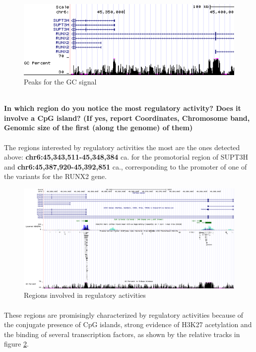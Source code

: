 \documentclass[12pt, a4paper]{article}
\begin{document}
\begin{figure}[h]
		\centering
		\includegraphics[width = .8\textwidth]{GC_peaks}
		\caption{Peaks for the GC signal}
		\label{GC peaks}
\end{figure}
	
\textbf{\\ In which region do you notice the most regulatory activity? Does it involve a CpG island? (If yes, report Coordinates, Chromosome band, Genomic size of the first (along the genome) of them)}%
\paragraph{}The regions interested by regulatory activities the most are the ones detected above: \textbf{chr6:45,343,511-45,348,384} ca. for the promotorial region of SUPT3H and \textbf{chr6:45,387,920-45,392,851} ca., corresponding to the promoter of one of the variants for the RUNX2 gene.

\begin{figure}[h]
	\centering
	\includegraphics[width = \textwidth]{regulatory_regions}
	\caption{Regions involved in regulatory activities}
	\label{regulatory regions}
\end{figure}

\paragraph{}These regions are promisingly characterized by regulatory activities because of the conjugate presence of CpG islands, strong evidence of H3K27 acetylation and the binding of several transcription factors, as shown by the relative tracks in figure \ref{regulatory regions}.
\end{document}
